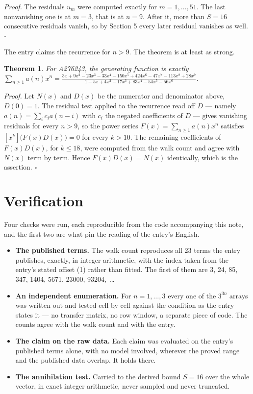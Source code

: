 \documentclass[11pt]{article}
\newtheorem{theorem}{Theorem}
\theoremstyle{definition}
\begin{document}
{\itshape Proof.} The residuals $u_m$ were computed exactly for $m = 1,\dots,51$. The last nonvanishing one is at $m = 3$, that is at $n = 9$. After it, more than $S = 16$ consecutive residuals vanish, so by Section 5 every later residual vanishes as well. $\square$

The entry claims the recurrence for $n > 9$. The theorem is at least as strong.

\begin{theorem} For A276243, the generating function is exactly $\sum_{n\ge 1} a(n)x^n = \frac{3x + 9x^{2} - 23x^{3} - 33x^{4} - 150x^{5} + 424x^{6} - 47x^{7} - 113x^{8} + 28x^{9}}{1 - 5x + 4x^{2} - 17x^{3} + 83x^{4} - 54x^{5} - 56x^{6}}$.\end{theorem}

{\itshape Proof.} Let $N(x)$ and $D(x)$ be the numerator and denominator above, $D(0)=1$. The residual test applied to the recurrence read off $D$ --- namely $a(n) = \sum_i c_i a(n-i)$ with $c_i$ the negated coefficients of $D$ --- gives vanishing residuals for every $n > 9$, so the power series $F(x)=\sum_{n\ge 1}a(n)x^n$ satisfies $[x^k]\bigl(F(x)D(x)\bigr) = 0$ for every $k > 10$. The remaining coefficients of $F(x)D(x)$, for $k \le 18$, were computed from the walk count and agree with $N(x)$ term by term. Hence $F(x)D(x) = N(x)$ identically, which is the assertion. $\square$

\section{Verification}

Four checks were run, each reproducible from the code accompanying this note, and the first two are what pin the reading of the entry's English.

\begin{itemize}

\item {\bfseries The published terms.} The walk count reproduces all 23 terms the entry publishes, exactly, in integer arithmetic, with the index taken from the entry's stated offset (1) rather than fitted. The first of them are 3, 24, 85, 347, 1404, 5671, 23000, 93204,~\dots

\item {\bfseries An independent enumeration.} For $n = 1,\dots,3$ every one of the $3^{3n}$ arrays was written out and tested cell by cell against the condition as the entry states it --- no transfer matrix, no row window, a separate piece of code. The counts agree with the walk count and with the entry.

\item {\bfseries The claim on the raw data.} Each claim was evaluated on the entry's published terms alone, with no model involved, wherever the proved range and the published data overlap. It holds there.

\item {\bfseries The annihilation test.} Carried to the derived bound $S = 16$ over the whole vector, in exact integer arithmetic, never sampled and never truncated.

\end{itemize}
\end{document}

